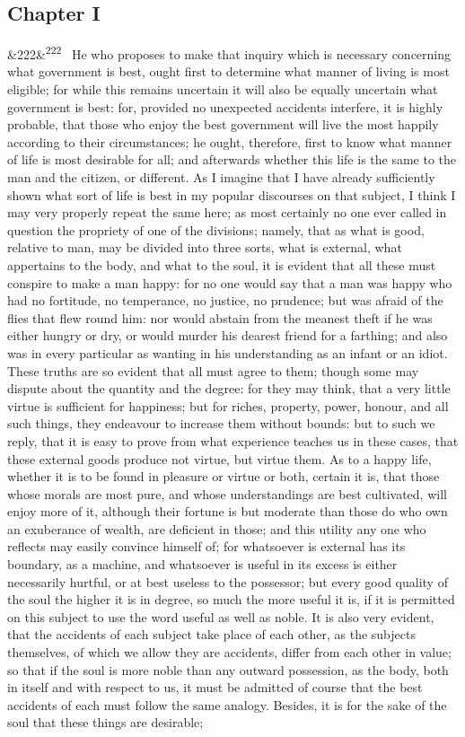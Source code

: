 \documentclass[12pt]{article}
\newcommand{\para}[1][]{\par\noindent\ifx&#1&\else\textsuperscript{\footnotesize #1}~\fi}
\begin{document}
\subsection*{Chapter I}

\para[222] He who proposes to make that inquiry which is necessary concerning what government is best, ought first to determine what manner of living is most eligible; for while this remains uncertain it will also be equally uncertain what government is best: for, provided no unexpected accidents interfere, it is highly probable, that those who enjoy the best government will live the most happily according to their circumstances; he ought, therefore, first to know what manner of life is most desirable for all; and afterwards whether this life is the same to the man and the citizen, or different. As I imagine that I have already sufficiently shown what sort of life is best in my popular discourses on that subject, I think I may very properly repeat the same here; as most certainly no one ever called in question the propriety of one of the divisions; namely, that as what is good, relative to man, may be divided into three sorts, what is external, what appertains to the body, and what to the soul, it is evident that all these must conspire to make a man happy: for no one would say that a man was happy who had no fortitude, no temperance, no justice, no prudence; but was afraid of the flies that flew round him: nor would abstain from the meanest theft if he was either hungry or dry, or would murder his dearest friend for a farthing; and also was in every particular as wanting in his understanding as an infant or an idiot. These truths are so evident that all must agree to them; though some may dispute about the quantity and the degree: for they may think, that a very little virtue is sufficient for happiness; but for riches, property, power, honour, and all such things, they endeavour to increase them without bounds: but to such we reply, that it is easy to prove from what experience teaches us in these cases, that these external goods produce not virtue, but virtue them. As to a happy life, whether it is to be found in pleasure or virtue or both, certain it is, that those whose morals are most pure, and whose understandings are best cultivated, will enjoy more of it, although their fortune is but moderate than those do who own an exuberance of wealth, are deficient in those; and this utility any one who reflects may easily convince himself of; for whatsoever is external has its boundary, as a machine, and whatsoever is useful in its excess is either necessarily hurtful, or at best useless to the possessor; but every good quality of the soul the higher it is in degree, so much the more useful it is, if it is permitted on this subject to use the word useful as well as noble. It is also very evident, that the accidents of each subject take place of each other, as the subjects themselves, of which we allow they are accidents, differ from each other in value; so that if the soul is more noble than any outward possession, as the body, both in itself and with respect to us, it must be admitted of course that the best accidents of each must follow the same analogy. Besides, it is for the sake of the soul that these things are desirable; 
\end{document}
